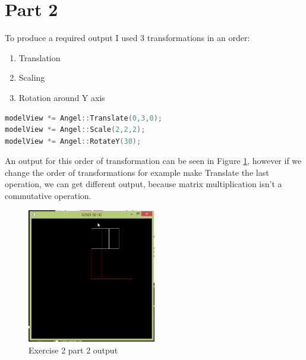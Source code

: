\section{Part 2}
To produce a required output I used 3 transformations in an order:
\begin{enumerate}
\item Translation
\item Scaling
\item Rotation around Y axis
\end{enumerate}
\begin{lstlisting}[language=cpp, caption={Transformations}]
modelView *= Angel::Translate(0,3,0);
modelView *= Angel::Scale(2,2,2);
modelView *= Angel::RotateY(30);
\end{lstlisting}
An output for this order of transformation can be seen in Figure \ref{fig:exercise_2_part_2},
however if we change the order of transformations for example make Translate the last operation,
we can get different output, because matrix multiplication isn't a commutative operation.
\begin{figure}[ht!]
	\begin{center}
		\includegraphics[width=0.5\textwidth]{figures/exercise_2_part_2}
	\end{center}
	\caption{Exercise 2 part 2 output}
	\label{fig:exercise_2_part_2} 
\end{figure}
\clearpage


